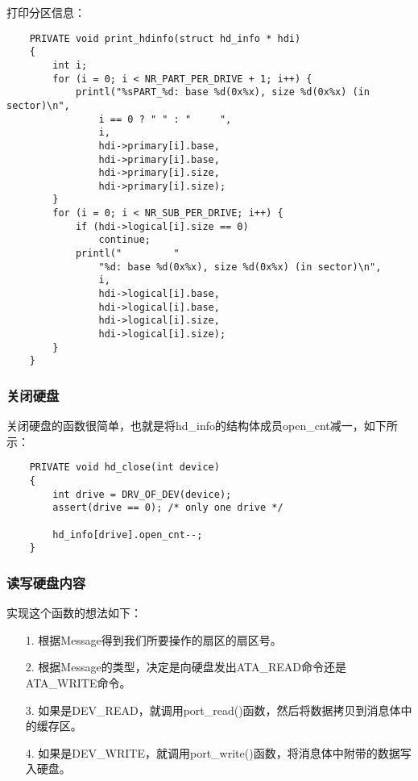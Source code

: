 \documentclass[a4paper,left=2.5cm,right=2.5cm,11pt]{article}
\begin{document}
	打印分区信息：
	\begin{lstlisting}
	PRIVATE void print_hdinfo(struct hd_info * hdi)
	{
		int i;
		for (i = 0; i < NR_PART_PER_DRIVE + 1; i++) {
			printl("%sPART_%d: base %d(0x%x), size %d(0x%x) (in sector)\n",
				i == 0 ? " " : "     ",
				i,
				hdi->primary[i].base,
				hdi->primary[i].base,
				hdi->primary[i].size,
				hdi->primary[i].size);
		}
		for (i = 0; i < NR_SUB_PER_DRIVE; i++) {
			if (hdi->logical[i].size == 0)
				continue;
			printl("         "
				"%d: base %d(0x%x), size %d(0x%x) (in sector)\n",
				i,
				hdi->logical[i].base,
				hdi->logical[i].base,
				hdi->logical[i].size,
				hdi->logical[i].size);
		}
	}
	\end{lstlisting}

\subsubsection{关闭硬盘}
	关闭硬盘的函数很简单，也就是将hd\_info的结构体成员open\_cnt减一，如下所示：
	\begin{lstlisting}
	PRIVATE void hd_close(int device)
	{
		int drive = DRV_OF_DEV(device);
		assert(drive == 0);	/* only one drive */

		hd_info[drive].open_cnt--;
	}
	\end{lstlisting}

\subsubsection{读写硬盘内容}
	实现这个函数的想法如下：
	\begin{itemize}
		\item[1.] 根据Message得到我们所要操作的扇区的扇区号。
		\item[2.] 根据Message的类型，决定是向硬盘发出ATA\_READ命令还是ATA\_WRITE命令。
		\item[3.] 如果是DEV\_READ，就调用port\_read()函数，然后将数据拷贝到消息体中的缓存区。
		\item[4.] 如果是DEV\_WRITE，就调用port\_write()函数，将消息体中附带的数据写入硬盘。
	\end{itemize}
\end{document}
